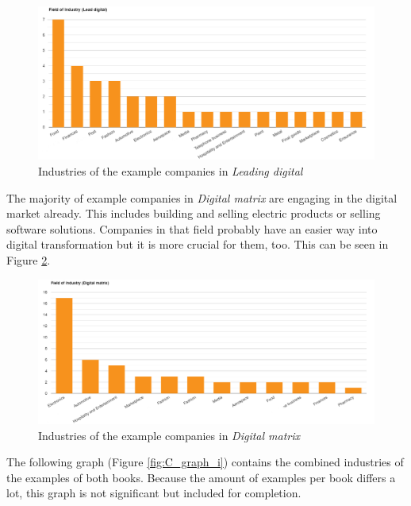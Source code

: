\documentclass[a4]{scrartcl}
\begin{document}
\begin{figure}[H]
	\centering
	\includegraphics[width=1\textwidth]{images/LD_graph_i.png}
	\caption{Industries of the example companies in \textit{Leading digital} \cite{leadingdigital}}
	\label{fig:LD_graph_i}
\end{figure}

The majority of example companies in \textit{Digital matrix} are engaging in the digital market already. This includes building and selling electric products or selling software solutions. Companies in that field probably have an easier way into digital transformation but it is more crucial for them, too. This can be seen in Figure \ref{fig:DM_graph_i}. \cite{digitalmatrix}

\begin{figure}[H]
	\centering
	\includegraphics[width=1\textwidth]{images/MD_graph_i.png}
	\caption{Industries of the example companies in \textit{Digital matrix} \cite{digitalmatrix}}
	\label{fig:DM_graph_i}
\end{figure}



The following graph (Figure \ref{fig:C_graph_i}) contains the combined industries of the examples of both books. Because the amount of examples per book differs a lot, this graph is not significant but included for completion. \cite{digitalmatrix, leadingdigital}
\end{document}
